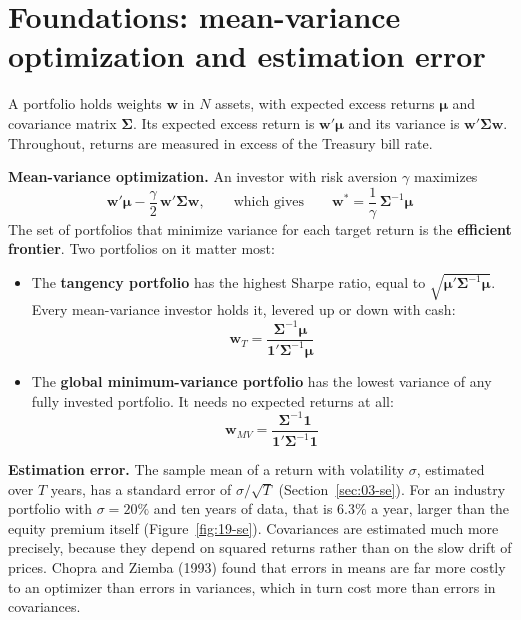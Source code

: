 \section{Foundations: mean-variance optimization and estimation error}
\label{sec:19-foundations}

A portfolio holds weights $\mathbf{w}$ in $N$ assets, with expected excess returns $\boldsymbol{\mu}$ and covariance matrix $\boldsymbol{\Sigma}$. Its expected excess return is $\mathbf{w}'\boldsymbol{\mu}$ and its variance is $\mathbf{w}'\boldsymbol{\Sigma}\mathbf{w}$. Throughout, returns are measured in excess of the Treasury bill rate.

\textbf{Mean-variance optimization.} An investor with risk aversion $\gamma$ maximizes
\begin{equation}
  \mathbf{w}'\boldsymbol{\mu} - \frac{\gamma}{2}\,\mathbf{w}'\boldsymbol{\Sigma}\mathbf{w}, \qquad \text{which gives} \qquad \mathbf{w}^* = \frac{1}{\gamma}\,\boldsymbol{\Sigma}^{-1}\boldsymbol{\mu}
  \label{eq:19-mv}
\end{equation}
The set of portfolios that minimize variance for each target return is the \textbf{efficient frontier}. Two portfolios on it matter most:

\begin{itemize}
  \item The \textbf{tangency portfolio} has the highest Sharpe ratio, equal to $\sqrt{\boldsymbol{\mu}'\boldsymbol{\Sigma}^{-1}\boldsymbol{\mu}}$. Every mean-variance investor holds it, levered up or down with cash:
  \begin{equation}
    \mathbf{w}_T = \frac{\boldsymbol{\Sigma}^{-1}\boldsymbol{\mu}}{\mathbf{1}'\boldsymbol{\Sigma}^{-1}\boldsymbol{\mu}}
    \label{eq:19-tangency}
  \end{equation}
  \item The \textbf{global minimum-variance portfolio} has the lowest variance of any fully invested portfolio. It needs no expected returns at all:
  \begin{equation}
    \mathbf{w}_{MV} = \frac{\boldsymbol{\Sigma}^{-1}\mathbf{1}}{\mathbf{1}'\boldsymbol{\Sigma}^{-1}\mathbf{1}}
    \label{eq:19-minvar}
  \end{equation}
\end{itemize}

\textbf{Estimation error.} The sample mean of a return with volatility $\sigma$, estimated over $T$ years, has a standard error of $\sigma/\sqrt{T}$ (Section~\ref{sec:03-se}). For an industry portfolio with $\sigma = 20\%$ and ten years of data, that is 6.3\% a year, larger than the equity premium itself (Figure~\ref{fig:19-se}). Covariances are estimated much more precisely, because they depend on squared returns rather than on the slow drift of prices. Chopra and Ziemba (1993) found that errors in means are far more costly to an optimizer than errors in variances, which in turn cost more than errors in covariances.

